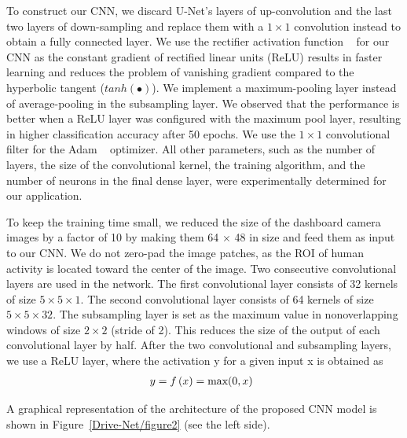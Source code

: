 \documentclass[conference,compsoc]{IEEEtran}
\begin{document}
To construct our CNN, we discard U-Net's layers of up-convolution and the last two layers of down-sampling and replace them with a $1\times1 $ convolution instead to obtain a fully connected layer. We use the rectifier activation function \unskip~\cite{1641075:26775860} for our CNN as the constant gradient of rectified linear units (ReLU) results in faster learning and reduces the problem of vanishing gradient compared to the hyperbolic tangent (${{tanh}{\left(\bullet\right)}} $). We implement a maximum-pooling layer instead of average-pooling in the subsampling layer. We observed that the performance is better when a ReLU layer was configured with the maximum pool layer, resulting in higher classification accuracy after 50 epochs. We use the $1\times1 $ convolutional filter for the Adam \unskip~\cite{1641075:26775857} optimizer. All other parameters, such as the number of layers, the size of the convolutional kernel, the training algorithm, and the number of neurons in the final dense layer, were experimentally determined for our application.

To keep the training time small, we reduced the size of the dashboard camera images by a factor of 10 by making them 64 \ensuremath{\times} 48 in size and feed them as input to our CNN. We do not zero-pad the image patches, as the ROI of human activity is located toward the center of the image. Two consecutive convolutional layers are used in the network. The first convolutional layer consists of 32 kernels of size $5\times5\times1 $. The second convolutional layer consists of 64 kernels of size $5\times5\times32 $. The subsampling layer is set as the maximum value in nonoverlapping windows of size $2\times2 $ (stride of 2). This reduces the size of the output of each convolutional layer by half. After the two convolutional and subsampling layers, we use a ReLU layer, where the activation y for a given input x is obtained as
\let\saveeqnno\theequation
\let\savefrac\frac
\def\dispfrac{\displaystyle\savefrac}
\begin{eqnarray}
\let\frac\dispfrac
\gdef\theequation{1}
\let\theHequation\theequation
\label{disp-formula-group-e98e45e883854b6aa2d919dcc0573fee}
\begin{array}{@{}l}y=f\left(x\right)=\text{max}(0,x)\end{array}
\end{eqnarray}
\global\let\theequation\saveeqnno
\addtocounter{equation}{-1}\ignorespaces 
A graphical representation of the architecture of the proposed CNN model is shown in Figure~\ref{Drive-Net/figure2}  (see the left side).
\end{document}
